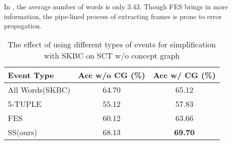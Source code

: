 In , 
the average number of words is only 3.43. 
Though FES brings in more information, 
the pipe-lined process of extracting frames is prone to error propagation.

\begin{table}[th]
\scriptsize
\centering
\begin{tabular}{lcc}
\hline
\textbf{Event Type} & Acc w/o CG (\%) & Acc w/ CG (\%)\\
\hline \hline
All Words(SKBC)& 64.70 & 65.12\\
\hline
5-TUPLE&55.12 &57.83\\
FES&60.12 &63.66\\
SS(ours)& 68.13 &{\bf 69.70} \\
\hline
\end{tabular}
\caption{The effect of using different types of events for simplification with SKBC
on SCT w/o concept graph}
\label{tab:sse}
\end{table}

\begin{table}[th]
\scriptsize
\centering
{}
\caption{Reduction in length of sentence using different types of
events. 
Before = avg. num of words before simplify,
After = avg. num of words after simplify, Events = avg. num of events
extracted.}
\label{tab:size}
\end{table}



